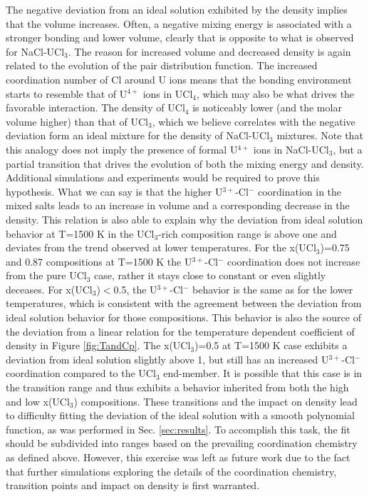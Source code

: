 \documentclass[preprint,3p,10pt,onecolumn,number,sort&compress]{elsarticle}
\begin{document}
{The negative deviation from an ideal solution exhibited by the density implies that the volume increases. Often, a negative mixing energy is associated with a stronger bonding and lower volume, clearly that is opposite to what is observed for NaCl-UCl$_3$. The reason for increased volume and decreased density is again related to the evolution of the pair distribution function. The increased coordination number of Cl around U ions means that the bonding environment starts to resemble that of U$^{4+}$ ions in UCl$_4$, which may also be what drives the favorable interaction. The density of UCl$_4$ is noticeably lower (and the molar volume higher) than that of UCl$_3$, which we believe correlates with the negative deviation form an ideal mixture for the density of NaCl-UCl$_3$ mixtures. Note that this analogy does not imply the presence of formal U$^{4+}$ ions in NaCl-UCl$_3$, but a partial transition that drives the evolution of both the mixing energy and density. Additional simulations and experiments would be required to prove this hypothesis. What we can say is that the higher U$^{3+}$-Cl$^{-}$ coordination in the mixed salts leads to an increase in volume and a corresponding decrease in the density. This relation is also able to explain why the deviation from ideal solution behavior at T=1500 K in the UCl$_3$-rich composition range is above one and deviates from the trend observed at lower temperatures. For the x(UCl$_3$)=0.75 and 0.87 compositions at T=1500 K the U$^{3+}$-Cl$^{-}$ coordination does not increase from the pure UCl$_3$ case, rather it stays close to constant or even slightly deceases. For x(UCl$_3$)$<$0.5, the U$^{3+}$-Cl$^{-}$ behavior is the same as for the lower temperatures, which is consistent with the agreement between the deviation from ideal solution behavior for those compositions. This behavior is also the source of the deviation from a linear relation for the temperature dependent coefficient of density in Figure \ref{fig:TandCp}. The x(UCl$_3$)=0.5 at T=1500 K case exhibits a deviation from ideal solution slightly above 1, but still has an increased U$^{3+}$-Cl$^{-}$ coordination compared to the UCl$_3$ end-member. It is possible that this case is in the transition range and thus exhibits a behavior inherited from both the high and low x(UCl$_3$) compositions. These transitions and the impact on density lead to difficulty fitting the deviation of the ideal solution with a smooth polynomial function, as was performed in Sec. \ref{sec:results}. To accomplish this task, the fit should be subdivided into ranges based on the prevailing coordination chemistry as defined above. However, this exercise was left as future work due to the fact that further simulations exploring the details of the coordination chemistry, transition points and impact on density is first warranted.

}
\end{document}
